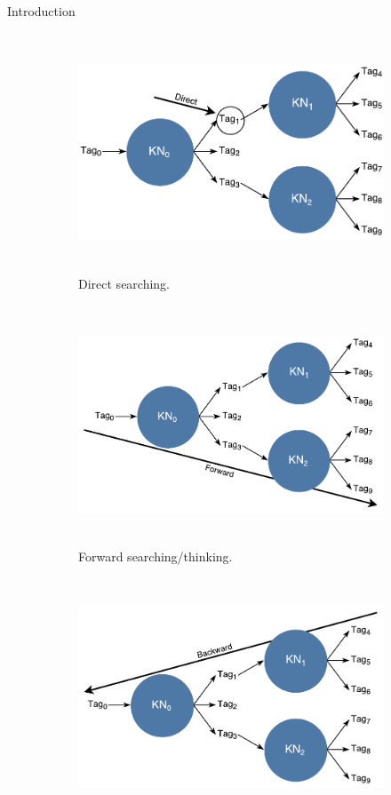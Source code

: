 \documentclass[final]{beamer} %
\begin{document}
\begin{frame}
\begin{columns}
\begin{column}{.3\textwidth}
{\begin{block}{Introduction}
					\begin{figure}[!htb]
						\centering
						\begin{subfigure}[!htb]{0.49\columnwidth}
							\centering
							\includegraphics[height=2.8in]{figures/direct_search.pdf}
							\caption{Direct searching.}
						\end{subfigure}
						\begin{subfigure}[!htb]{0.49\columnwidth}
							\centering
							\includegraphics[height=2.8in]{figures/forward_search.pdf}
							\caption{Forward searching/thinking.}
							\label{think_forwards}
						\end{subfigure}
						\bigskip
						\begin{subfigure}[!htb]{0.49\columnwidth}
							\centering
							\includegraphics[height=2.8in]{figures/backward_search.pdf}

\end{subfigure}
\end{figure}
\end{block}}
\end{column}
\end{columns}
\end{frame}
\end{document}
